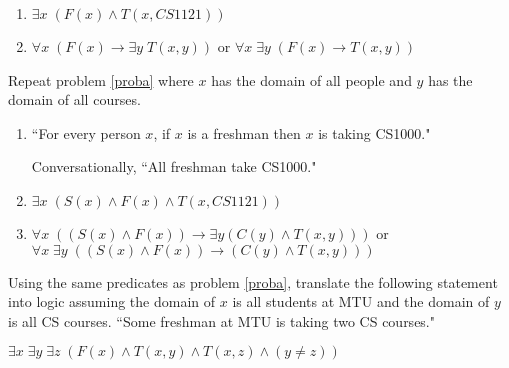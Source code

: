 \documentclass[12pt,addpoints]{exam}
\newcommand{\ra}{\rightarrow}
\begin{document}
\begin{questions}
\begin{solution}
\begin{enumerate}[label=(\alph*),itemsep=0pt,parsep=0pt,
    	topsep=0pt,partopsep=0pt]
            Conversationally, ``All freshman at MTU take CS1000."
        \item $\exists x\; (F(x) \wedge T(x,CS 1121))$
        \item $\forall x\; (F(x) \ra \exists y\; T(x,y))$ or $\forall x\; \exists y\; (F(x) \ra T(x,y))$
    \end{enumerate}
\end{solution}


\question[7] Repeat problem \ref{proba} where $x$ has the domain of all people and $y$ has the domain of all courses.
    \ifprintanswers
        \vspace{-12pt}
    \fi
\begin{solution}
    \begin{enumerate}[label=(\alph*),itemsep=0pt,parsep=0pt,
    	topsep=0pt,partopsep=0pt]
        \item  ``For every person $x$, if $x$ is a freshman then $x$ is taking CS1000."

            Conversationally, ``All freshman take CS1000."
        \item $\exists x\; (S(x) \wedge F(x) \wedge T(x,CS 1121))$
        \item $\forall x\; ((S(x) \wedge F(x)) \ra \exists y (C(y) \wedge T(x,y)))$ or \\
        $\forall x\; \exists y\; ((S(x) \wedge F(x)) \ra (C(y) \wedge T(x,y)))$
    \end{enumerate}
\end{solution}


\bonusquestion[2] Using the same predicates as problem \ref{proba}, translate the following statement into logic assuming the domain of $x$ is all students at MTU and the domain of $y$ is all CS courses.
``Some freshman at MTU is taking two CS courses."
    \ifprintanswers
        \vspace{-12pt}
    \fi
\begin{solution}
	$\exists x\; \exists y\; \exists z\;(F(x) \wedge T(x,y) \wedge T(x,z) \wedge (y \neq z))$
\end{solution}



\end{questions}
\end{document}
